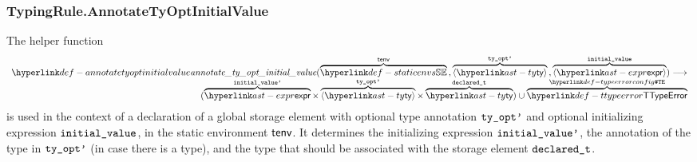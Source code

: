\subsubsection{TypingRule.AnnotateTyOptInitialValue\label{sec:TypingRule.AnnotateTyOptInitialValue}}
\hypertarget{def-annotatetyoptinitialvalue}{}
The helper function
\[
\begin{array}{r}
\annotatetyoptinitialvalue(\overname{\staticenvs}{\tenv} \aslsep \overname{\langle\ty\rangle}{\tyoptp}
  \aslsep \overname{\langle\expr\rangle}{\initialvalue}) \aslto \\
  (\overname{\expr}{\initialvaluep} \times \overname{\langle\ty\rangle}{\tyoptp} \times \overname{\ty}{\declaredt})
  \cup \overname{\TTypeError}{\TypeErrorConfig}
\end{array}
\]
is used in the context of a declaration of a global storage element with optional type annotation $\texttt{ty\_opt'}$
and optional initializing expression $\texttt{initial\_value}$, in the static environment $\textsf{tenv}$.
It determines the initializing expression $\texttt{initial\_value'}$,
the annotation of the type in $\texttt{ty\_opt'}$ (in case there is a type), and the type
that should be associated with the storage element $\texttt{declared\_t}$.


